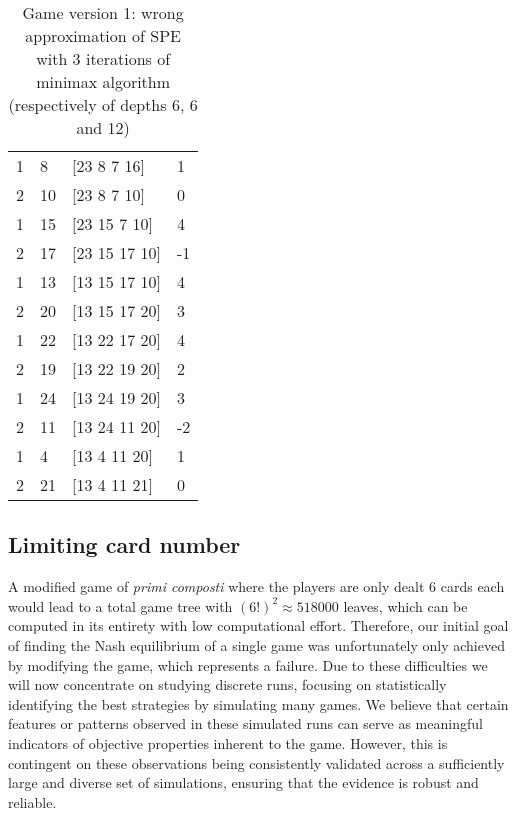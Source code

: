 \documentclass[conference]{IEEEtran}
\begin{document}
\begin{table}[h]
{{\begin{tabular}{l l l l}
 1     &  8          &  [23 8 7 16]   &  1     \\          
 2     &  10         &  [23 8 7 10]   &  0     \\       
 1     &  15         &  [23 15 7 10]  &  4     \\       
 2     &  17         &  [23 15 17 10] &  -1    \\    
 1     &  13         &  [13 15 17 10] &  4     \\    
 2     &  20         &  [13 15 17 20] &  3     \\ 
 1     &  22         &  [13 22 17 20] &  4     \\ 
 2     &  19         &  [13 22 19 20] &  2     \\                           
 1     &  24         &  [13 24 19 20] &  3     \\                           
 2     &  11         &  [13 24 11 20] &  -2    \\                        
 1     &  4          &  [13 4 11 20]  &  1     \\                        
 2     &  21         &  [13 4 11 21]  &  0     
 
\end{tabular}
}
}
  \caption{Game version 1: wrong approximation of SPE with 3 iterations of minimax algorithm (respectively of depths 6, 6 and 12)}
\end{table}

\subsection{Limiting card number}
A modified game of \textit{primi composti} where the players are only dealt 6 cards each would lead to a total game tree with $(6!)^2 \approx 518000$ leaves, which can be computed in its entirety with low computational effort. Therefore, our initial goal of finding the Nash equilibrium of a single game was unfortunately only achieved by modifying the game, which represents a failure. Due to these difficulties we will now concentrate on studying discrete runs, focusing on statistically identifying the best strategies by simulating many games. We believe that certain features or patterns observed in these simulated runs can serve as meaningful indicators of objective properties inherent to the game. However, this is contingent on these observations being consistently validated across a sufficiently large and diverse set of simulations, ensuring that the evidence is robust and reliable.
\end{document}
